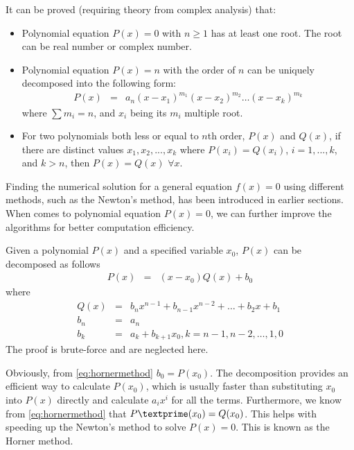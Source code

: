 It can be proved (requiring theory from complex analysis) that:
\begin{itemize}
  \item Polynomial equation $P(x)=0$ with $n\geq 1$ has at least one root. The root can be real number or complex number.
  \item Polynomial equation $P(x)=n$ with the order of $n$ can be uniquely decomposed into the following form:
  \begin{eqnarray}
  P(x) &=& a_n(x-x_1)^{m_1}(x-x_2)^{m_2}\ldots(x-x_k)^{m_k} \nonumber
\end{eqnarray}
where $\sum m_i = n$, and $x_i$ being its $m_i$ multiple root.
  \item For two polynomials both less or equal to $n$th order, $P(x)$ and $Q(x)$, if there are distinct values $x_1, x_2, ..., x_k$ where $P(x_i)=Q(x_i)$, $i = 1,...,k$, and $k>n$, then $P(x)=Q(x)$ $\forall x$.
\end{itemize}

Finding the numerical solution for a general equation $f(x)=0$ using different methods, such as the Newton's method, has been introduced in earlier sections. When comes to polynomial equation $P(x)=0$, we can further improve the algorithms for better computation efficiency.

Given a polynomial $P(x)$ and a specified variable $x_0$, $P(x)$ can be decomposed as follows
\begin{eqnarray}
P(x) &=& (x-x_0)Q(x) + b_0 \label{eq:hornermethod}
\end{eqnarray}
where
\begin{eqnarray}
  Q(x) &=& b_nx^{n-1} + b_{n-1}x^{n-2} + \ldots + b_2x + b_1 \nonumber \\
  b_n &=& a_n \nonumber \\
  b_k &=& a_k + b_{k+1}x_0, k=n-1, n-2, \ldots, 1, 0 \nonumber
\end{eqnarray}
The proof is brute-force and are neglected here.

Obviously, from \eqref{eq:hornermethod} $b_0 = P(x_0)$. The decomposition provides an efficient way to calculate $P(x_0)$, which is usually faster than substituting $x_0$ into $P(x)$ directly and calculate $a_ix^i$ for all the terms. Furthermore, we know from \eqref{eq:hornermethod} that $P\textprime(x_0)=Q(x_0)$. This helps with speeding up the Newton's method to solve $P(x)=0$. This is known as the Horner method.



